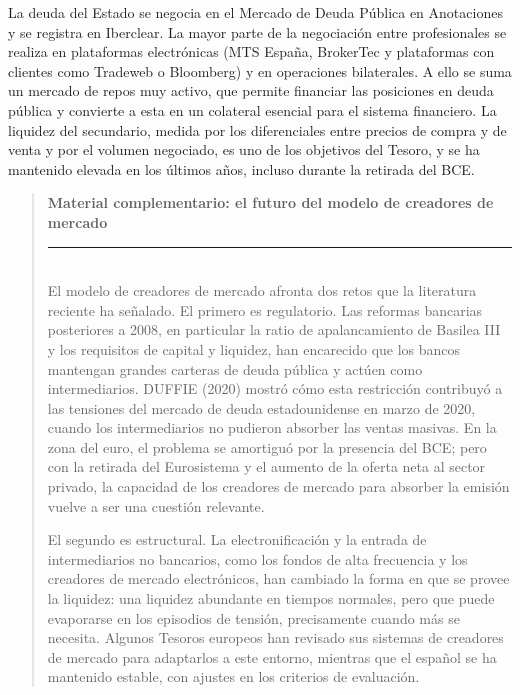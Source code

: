 \documentclass[10pt,a4paper]{article}
\newenvironment{specialblock}[1]{%
      \begin{quote} %
      \small %
      \noindent\textbf{#1}\\[-0.3em] %
      \rule{\linewidth}{0.4pt}\\[0.6em]}{
      \end{quote}}
\begin{document}
La deuda del Estado se negocia en el Mercado de Deuda Pública en Anotaciones y se registra en Iberclear. La mayor parte de la negociación entre profesionales se realiza en plataformas electrónicas (MTS España, BrokerTec y plataformas con clientes como Tradeweb o Bloomberg) y en operaciones bilaterales. A ello se suma un mercado de repos muy activo, que permite financiar las posiciones en deuda pública y convierte a esta en un colateral esencial para el sistema financiero. La liquidez del secundario, medida por los diferenciales entre precios de compra y de venta y por el volumen negociado, es uno de los objetivos del Tesoro, y se ha mantenido elevada en los últimos años, incluso durante la retirada del BCE.

\begin{specialblock}{\textbf{Material complementario:} el futuro del modelo de creadores de mercado}
    El modelo de creadores de mercado afronta dos retos que la literatura reciente ha señalado. El primero es regulatorio. Las reformas bancarias posteriores a 2008, en particular la ratio de apalancamiento de Basilea III y los requisitos de capital y liquidez, han encarecido que los bancos mantengan grandes carteras de deuda pública y actúen como intermediarios. DUFFIE (2020) mostró cómo esta restricción contribuyó a las tensiones del mercado de deuda estadounidense en marzo de 2020, cuando los intermediarios no pudieron absorber las ventas masivas. En la zona del euro, el problema se amortiguó por la presencia del BCE; pero con la retirada del Eurosistema y el aumento de la oferta neta al sector privado, la capacidad de los creadores de mercado para absorber la emisión vuelve a ser una cuestión relevante.

    El segundo es estructural. La electronificación y la entrada de intermediarios no bancarios, como los fondos de alta frecuencia y los creadores de mercado electrónicos, han cambiado la forma en que se provee la liquidez: una liquidez abundante en tiempos normales, pero que puede evaporarse en los episodios de tensión, precisamente cuando más se necesita. Algunos Tesoros europeos han revisado sus sistemas de creadores de mercado para adaptarlos a este entorno, mientras que el español se ha mantenido estable, con ajustes en los criterios de evaluación.
\end{specialblock}
\end{document}
